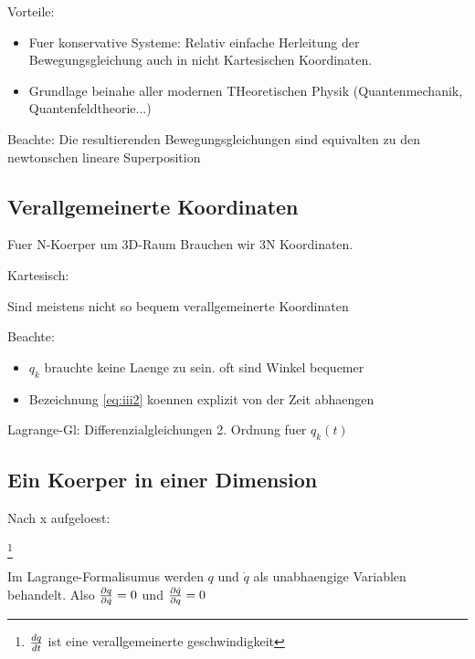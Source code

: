 Vorteile: 
\begin{itemize}
	\item Fuer konservative Systeme: Relativ einfache Herleitung der Bewegungsgleichung auch in nicht Kartesischen Koordinaten.

	\item Grundlage beinahe aller modernen THeoretischen Physik (Quantenmechanik, Quantenfeldtheorie...)
\end{itemize}

Beachte: Die resultierenden Bewegungsgleichungen sind equivalten zu den newtonschen
\rightarrow lineare Superposition

\subsection{Verallgemeinerte Koordinaten}
Fuer N-Koerper um 3D-Raum Brauchen wir 3N Koordinaten.

Kartesisch: 

Sind meistens nicht so bequem \rightarrow verallgemeinerte Koordinaten



Beachte: 
\begin{itemize}
	\item $q_k$ brauchte keine Laenge zu sein. oft sind Winkel bequemer

	\item Bezeichnung \ref{eq:iii2} koennen explizit von der Zeit abhaengen
\end{itemize}


Lagrange-Gl: Differenzialgleichungen 2. Ordnung fuer $q_k(t)$

\subsection{Ein Koerper in einer Dimension}


Nach x aufgeloest:

\footnote{${d q \over d t}$ ist eine verallgemeinerte geschwindigkeit}

Im Lagrange-Formalisumus werden $q$ und $\dot q$ als unabhaengige Variablen behandelt. Also ${\partial q \over \partial \dot q} = 0$ und ${\partial \dot q \over \partial q} = 0$

